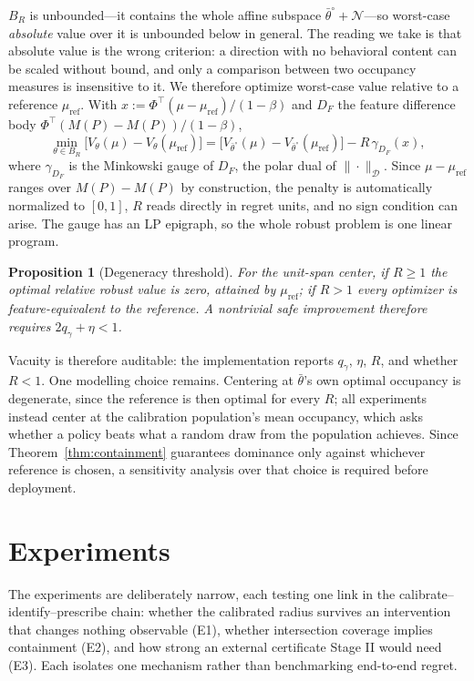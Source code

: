 \documentclass{article}
\newtheorem{proposition}{Proposition}
\newcommand{\Dnorm}[1]{\|#1\|_{\mathcal D}}
\begin{document}
$B_R$ is unbounded---it contains the whole affine subspace
$\bar\theta^\circ+\mathcal N$---so worst-case \emph{absolute} value over it is
unbounded below in general. The reading we take is that absolute value is the
wrong criterion: a
direction with no behavioral content can be scaled without bound, and only a
comparison between two occupancy measures is insensitive to it. We therefore
optimize worst-case value relative to a reference $\mu_{\mathrm{ref}}$. With
$x:=\Phi^\top(\mu-\mu_{\mathrm{ref}})/(1-\beta)$ and $D_F$ the feature
difference body $\Phi^\top(M(P)-M(P))/(1-\beta)$,
\[
\min_{\theta\in B_R}\big[V_\theta(\mu)-V_\theta(\mu_{\mathrm{ref}})\big]
=\big[V_{\bar\theta^\circ}(\mu)-V_{\bar\theta^\circ}(\mu_{\mathrm{ref}})\big]
-R\,\gamma_{D_F}(x),
\]
where $\gamma_{D_F}$ is the Minkowski gauge of $D_F$, the polar dual of
$\Dnorm{\cdot}$. Since $\mu-\mu_{\mathrm{ref}}$ ranges over $M(P)-M(P)$ by
construction, the penalty is automatically normalized to $[0,1]$, $R$ reads
directly in regret units, and no sign condition can arise. The gauge has an LP
epigraph, so the whole robust problem is one linear program.

\begin{proposition}[Degeneracy threshold]
\label{prop:degeneracy}
For the unit-span center, if $R\ge1$ the optimal relative robust value is zero,
attained by $\mu_{\mathrm{ref}}$; if $R>1$ every optimizer is feature-equivalent
to the reference. A nontrivial safe improvement therefore requires
$2q_\gamma+\eta<1$.
\end{proposition}

Vacuity is therefore auditable: the implementation reports $q_\gamma$, $\eta$,
$R$, and whether $R<1$. One modelling choice remains. Centering at
$\bar\theta$'s own optimal occupancy is degenerate, since the reference is then
optimal for every $R$; all experiments instead center at the calibration
population's mean occupancy, which asks whether a policy beats what a random
draw from the population achieves. Since
Theorem~\ref{thm:containment} guarantees dominance only against whichever
reference is chosen, a sensitivity analysis over that choice is required before
deployment.

\section{Experiments}
\label{sec:experiments}

The experiments are deliberately narrow, each testing one link in the
calibrate--identify--prescribe chain: whether the calibrated radius survives an
intervention that changes nothing observable (E1), whether intersection
coverage implies containment (E2), and how strong an external certificate
Stage II would need (E3). Each isolates one mechanism rather than benchmarking
end-to-end regret.
\end{document}
